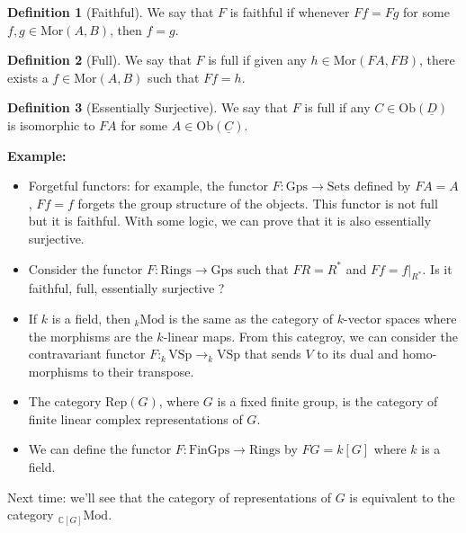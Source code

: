 \documentclass{article}
\theoremstyle{plain}
\theoremstyle{definition}
\newtheorem*{definition}{Definition}
\newcommand{\C}{\mathbb{C}}
\newenvironment{example}{\noindent\textbf{Example:} \vspace{-0.2cm}\begin{itemize}}{\end{itemize}}
\begin{document}
\begin{definition}[Faithful]
    We say that $F$ is faithful if whenever $Ff = Fg$ for some $f,g \in \text{Mor}(A,B)$, then $f = g$.
\end{definition}

\begin{definition}[Full]
    We say that $F$ is full if given any $h \in \text{Mor}(FA, FB)$, there exists a $f \in \text{Mor}(A,B)$ such that $Ff = h$.
\end{definition}

\begin{definition}[Essentially Surjective]
    We say that $F$ is full if any $C \in \text{Ob}(\underline{D})$ is isomorphic to $FA$ for some $A \in \text{Ob}(\underline{C})$.
\end{definition}

\begin{example}
    \item Forgetful functors: for example, the functor $F : \text{Gps} \to \text{Sets}$ defined by $FA = A$, $Ff = f$ forgets the group structure of the objects. This functor is not full but it is faithful. With some logic, we can prove that it is also essentially surjective.
    \item Consider the functor $F : \text{Rings} \to \text{Gps}$ such that $FR = R^*$ and $Ff = f|_{R^*}$. Is it faithful, full, essentially surjective ?
    \item If $k$ is a field, then ${}_k \text{Mod}$ is the same as the category of $k$-vector spaces where the morphisms are the $k$-linear maps. From this categroy, we can consider the contravariant functor $F : _k\text{VSp} \to _k\text{VSp}$ that sends $V$ to its dual and homo-morphisms to their transpose.
    \item The category $\text{Rep}(G)$, where $G$ is a fixed finite group, is the category of finite linear complex representations of $G$.
    \item We can define the functor $F : \text{FinGps} \to \text{Rings}$ by $FG = k[G]$ where $k$ is a field.
\end{example}

Next time: we'll see that the category of representations of $G$ is equivalent to the category ${}_{\C[G]}\text{Mod}$.
\end{document}
